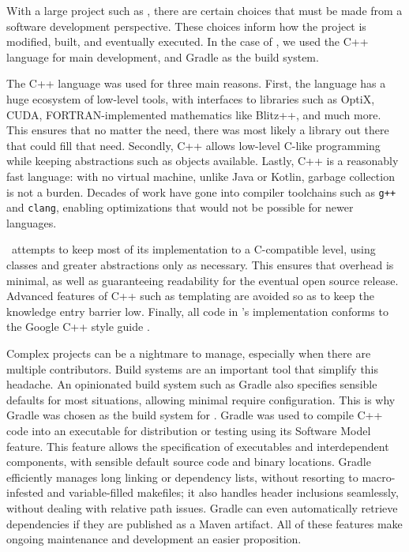With a large project such as \name, there are certain choices that must be made from a software development perspective.
These choices inform how the project is modified, built, and eventually executed.
In the case of \name, we used the C++ language \cite{cpp14standard} for main development, and Gradle \cite{gradle} as the build system.


The C++ language was used for three main reasons.
First, the language has a huge ecosystem of low-level tools, with interfaces to libraries such as OptiX, CUDA, FORTRAN-implemented mathematics like Blitz++, and much more.
This ensures that no matter the need, there was most likely a library out there that could fill that need.
Secondly, C++ allows low-level C-like programming while keeping abstractions such as objects available.
Lastly, C++ is a reasonably fast language: with no virtual machine, unlike Java or Kotlin, garbage collection is not a burden.
Decades of work have gone into compiler toolchains such as \texttt{g++} and \texttt{clang}, enabling optimizations that would not be possible for newer languages.

\name\ attempts to keep most of its implementation to a C-compatible level, using classes and greater abstractions only as necessary.
This ensures that overhead is minimal, as well as guaranteeing readability for the eventual open source release.
Advanced features of C++ such as templating are avoided so as to keep the knowledge entry barrier low.
Finally, all code in \name's implementation conforms to the Google C++ style guide \cite{googleStyleGuide}.


Complex projects can be a nightmare to manage, especially when there are multiple contributors.
Build systems are an important tool that simplify this headache.
An opinionated build system such as Gradle also specifies sensible defaults for most situations, allowing minimal require configuration.
This is why Gradle was chosen as the build system for \name.
Gradle was used to compile C++ code into an executable for distribution or testing using its Software Model feature.
This feature allows the specification of executables and interdependent components, with sensible default source code and binary locations.
Gradle efficiently manages long linking or dependency lists, without resorting to macro-infested and variable-filled makefiles; it also handles header inclusions seamlessly, without dealing with relative path issues.
Gradle can even automatically retrieve dependencies if they are published as a Maven artifact.
All of these features make ongoing maintenance and development an easier proposition.

